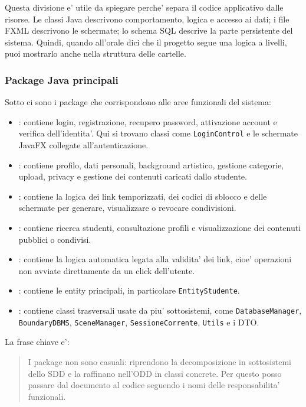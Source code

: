 ﻿\documentclass[11pt,a4paper]{article}
\begin{document}
Questa divisione e' utile da spiegare perche' separa il codice applicativo dalle risorse.
Le classi Java descrivono comportamento, logica e accesso ai dati; i file FXML descrivono
le schermate; lo schema SQL descrive la parte persistente del sistema. Quindi, quando
all'orale dici che il progetto segue una logica a livelli, puoi mostrarlo anche nella
struttura delle cartelle.

\subsubsection{Package Java principali}

Sotto  ci sono i package che corrispondono alle aree
funzionali del sistema:
\begin{itemize}
  \item {}: contiene login, registrazione, recupero password,
  attivazione account e verifica dell'identita'. Qui si trovano classi come
  \texttt{LoginControl} e le schermate JavaFX collegate all'autenticazione.
  \item {}: contiene profilo, dati personali, background artistico,
  gestione categorie, upload, privacy e gestione dei contenuti caricati dallo studente.
  \item {}: contiene la logica dei link temporizzati, dei codici
  di sblocco e delle schermate per generare, visualizzare o revocare condivisioni.
  \item {}: contiene ricerca studenti, consultazione profili e
  visualizzazione dei contenuti pubblici o condivisi.
  \item {}: contiene la logica automatica legata alla
  validita' dei link, cioe' operazioni non avviate direttamente da un click dell'utente.
  \item {}: contiene le entity principali, in particolare
  \texttt{EntityStudente}.
  \item {}: contiene classi trasversali usate da piu' sottosistemi, come
  \texttt{DatabaseManager}, \texttt{BoundaryDBMS}, \texttt{SceneManager},
  \texttt{SessioneCorrente}, \texttt{Utils} e i DTO.
\end{itemize}

La frase chiave e':
\begin{quote}
I package non sono casuali: riprendono la decomposizione in sottosistemi dello SDD e la
raffinano nell'ODD in classi concrete. Per questo posso passare dal documento al codice
seguendo i nomi delle responsabilita' funzionali.
\end{quote}
\end{document}
